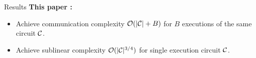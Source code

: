\begin{frame}{Results}
	\textbf{This paper \cite{Weng0YX022}:}
	\begin{itemize}
		\item Achieve communication complexity $\mathcal{O}(|\mathcal{C}| + B)$ for $B$ executions of the same circuit $\mathcal{C}$. 
		\item Achieve sublinear complexity $\mathcal{O}(|\mathcal{C}|^{3/4})$ for single execution circuit $\mathcal{C}$. 
	\end{itemize}
\end{frame}